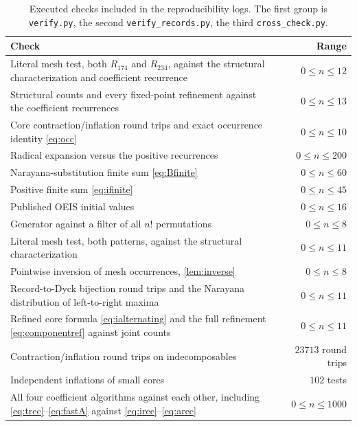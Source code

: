 \documentclass[11pt,letterpaper]{article}
\numberwithin{equation}{section}
\theoremstyle{definition}
\newcommand{\Rone}{R_{174}}
\newcommand{\Rtwo}{R_{234}}
\begin{document}
\begin{table}[ht]
\centering
\caption{Executed checks included in the reproducibility logs. The first
group is \texttt{verify.py}, the second \texttt{verify\_records.py}, the
third \texttt{cross\_check.py}.}
\begin{tabular}{p{}r}
\toprule
Check & Range\\
\midrule
Literal mesh test, both $\Rone$ and $\Rtwo$, against the structural
characterization and coefficient recurrence & $0\le n\le12$\\
Structural counts and every fixed-point refinement against the
coefficient recurrences & $0\le n\le13$\\
Core contraction/inflation round trips and exact occurrence identity
\eqref{eq:occ} & $0\le n\le10$\\
Radical expansion versus the positive recurrences & $0\le n\le200$\\
Narayana-substitution finite sum \eqref{eq:Bfinite} & $0\le n\le60$\\
Positive finite sum \eqref{eq:ifinite} & $0\le n\le45$\\
Published OEIS initial values & $0\le n\le16$\\
\midrule
Generator against a filter of all $n!$ permutations & $0\le n\le8$\\
Literal mesh test, both patterns, against the structural
characterization & $0\le n\le11$\\
Pointwise inversion of mesh occurrences, \cref{lem:inverse} &
$0\le n\le8$\\
Record-to-Dyck bijection round trips and the Narayana distribution of
left-to-right maxima & $0\le n\le11$\\
Refined core formula \eqref{eq:ialternating} and the full refinement
\eqref{eq:componentref} against joint counts & $0\le n\le11$\\
Contraction/inflation round trips on indecomposables &
$23713$ round trips\\
Independent inflations of small cores & $102$ tests\\
\midrule
All four coefficient algorithms against each other, including
\eqref{eq:trec}--\eqref{eq:fastA} against
\eqref{eq:irec}--\eqref{eq:arec} & $0\le n\le1000$\\
\bottomrule
\end{tabular}
\label{tab:checks}
\end{table}
\end{document}
